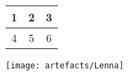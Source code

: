 \documentclass[12pt]{article}
\begin{document}
\begin{tabular}{|| c  c  c ||}
\hline
1 & 2 & 3\\
\hline
4 & 5 & 6\\
\hline
\end{tabular}

\texttt{[image: artefacts/Lenna]}
\end{document}
